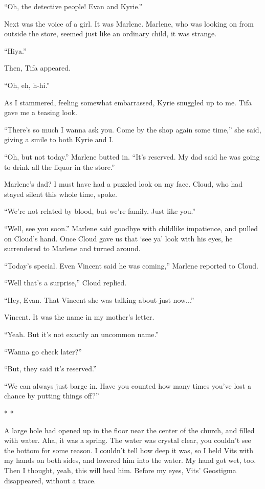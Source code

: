\documentclass[oneside]{book}
\begin{document}
“Oh, the detective people! Evan and Kyrie.”

Next was the voice of a girl. It was Marlene. Marlene, who was looking on from outside the store, seemed just like an ordinary child, it was strange.

“Hiya.”

Then, Tifa appeared.

“Oh, eh, h-hi.”

As I stammered, feeling somewhat embarrassed, Kyrie snuggled up to me. Tifa gave me a teasing look.

“There’s so much I wanna ask you. Come by the shop again some time,” she said, giving a smile to both Kyrie and I.

“Oh, but not today.” Marlene butted in. “It’s reserved. My dad said he was going to drink all the liquor in the store.”

Marlene’s dad? I must have had a puzzled look on my face. Cloud, who had stayed silent this whole time, spoke.

“We’re not related by blood, but we’re family. Just like you.”

“Well, see you soon.” Marlene said goodbye with childlike impatience, and pulled on Cloud’s hand. Once Cloud gave us that ‘see ya’ look with his eyes, he surrendered to Marlene and turned around.

“Today’s special. Even Vincent said he was coming,” Marlene reported to Cloud.

“Well that’s a surprise,” Cloud replied.

“Hey, Evan. That Vincent she was talking about just now...”

Vincent. It was the name in my mother’s letter.

“Yeah. But it’s not exactly an uncommon name.”

“Wanna go check later?”

“But, they said it’s reserved.”

“We can always just barge in. Have you counted how many times you’ve lost a chance by putting things off?”

* *

A large hole had opened up in the floor near the center of the church, and filled with water. Aha, it was a spring. The water was crystal clear, you couldn’t see the bottom for some reason. I couldn’t tell how deep it was, so I held Vits with my hands on both sides, and lowered him into the water. My hand got wet, too. Then I thought, yeah, this will heal him. Before my eyes, Vits’ Geostigma disappeared, without a trace.
\end{document}
